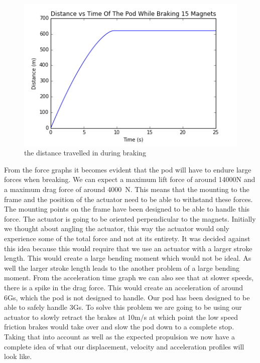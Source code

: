 \documentclass[main.tex]{subfiles}
\begin{document}
    \begin{figure}
        \centering
        \includegraphics[width=\linewidth]{images/distance_time_graph}
        \caption{the distance travelled in during braking}
        \label{fig:distance-profile}
    \end{figure}
    
    From the force graphs it becomes evident that the pod will have to endure large forces when breaking. We can expect a maximum lift force of around 14000N and a maximum drag force of around \SI{4000}{N}. This means that the mounting to the frame and the position of the actuator need to be able to withstand these forces. The mounting points on the frame have been designed to be able to handle this force. The actuator is going to be oriented perpendicular to the magnets. Initially we thought about angling the actuator, this way the actuator would only experience some of the total force and not at its entirety. It was decided against this idea because this would require that we use an actuator with a larger stroke length. This would create a large bending moment which would not be ideal. As well the larger stroke length leads to the another problem of a large bending moment.
    From the acceleration time graph we can also see that at slower speeds, there is a spike in the drag force. This would create an acceleration of around 6Gs, which the pod is not designed to handle. Our pod has been designed to be able to safely handle 3Gs. To solve this problem we are going to be using our actuator to slowly retract the brakes at 10m/s at which point the low speed friction brakes would take over and slow the pod down to a complete stop. 
   Taking that into account as well as the expected propulsion we now have a complete idea of what our displacement, velocity and acceleration profiles will look like.
   
\end{document}
